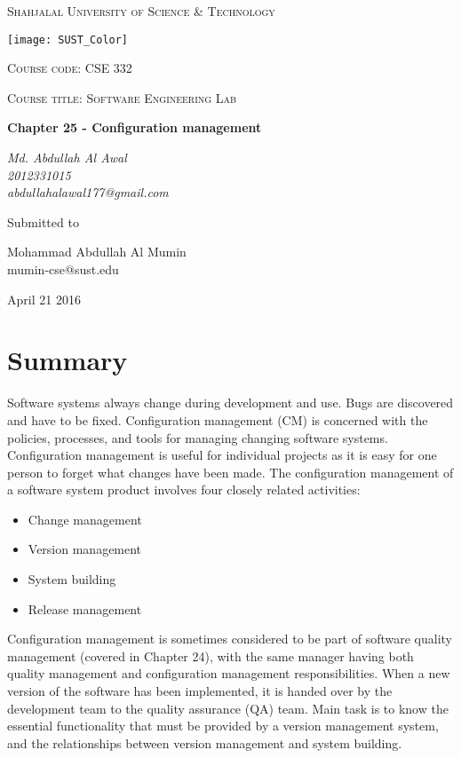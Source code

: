 \documentclass[8pt,a4paper]{article}
\begin{document}
\begin{titlepage}
	\centering
	{\scshape\LARGE Shahjalal University of Science \& Technology \par}
	\vspace{1cm}
	\texttt{[image: SUST\_Color]}\par\vspace{1cm}
	\vspace{1cm}
	{\scshape\Large Course code: CSE 332\par}
	{\scshape\Large Course title: Software Engineering Lab\par}
	\vspace{1.5cm}
	{\huge\bfseries Chapter 25 - Configuration management\par}
	\vspace{2cm}
	{\Large\itshape Md. Abdullah Al Awal\\2012331015\\abdullahalawal177@gmail.com\par}
	\vfill
	Submitted to\par
	Mohammad Abdullah Al Mumin\\mumin-cse@sust.edu\\ \textit{}

	\vfill

	{\large April 21 2016\par}
\end{titlepage}
\section*{Summary}
Software systems always change during development and use. Bugs are discovered
and have to be fixed. Configuration management (CM) is concerned with the policies, processes, and
tools for managing changing software systems. Configuration management is useful for individual projects as it is easy for one
person to forget what changes have been made. The configuration management of a software system product involves four
closely related activities:

\begin{itemize}
	\item Change management
	\item Version management
	\item System building
	\item Release management
\end{itemize}

Configuration management is sometimes considered to be part of software
quality management (covered in Chapter 24), with the same manager having
both quality management and configuration management responsibilities. When
a new version of the software has been implemented, it is handed over by the
development team to the quality assurance (QA) team.
Main task is to know the essential functionality that must be provided by a version
management system, and the relationships between version
management and system building.
\end{document}
